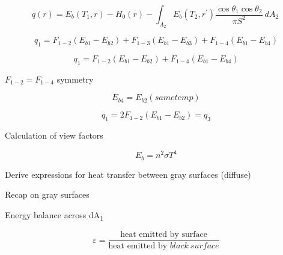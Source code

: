 \documentclass[12pt]{article}
\renewcommand{\_}{\kern-1.5pt\textunderscore\kern-1.5pt}
\begin{document}
\par

 \[ q \left( r \right)  =E_{b} \left( T_{1},r \right) -H_{0} \left( r \right)  - \int _{A_{2}}^{}E_{b} \left( T_{2},r^{'} \right) \frac{\cos  \theta _{1}\cos  \theta _{2}}{ \pi S^{2}}~dA_{2}~ \] \par

\par

\par

 \[ q_{1}=F_{1-2} \left( E_{b1}-E_{b2} \right) +F_{1-3} \left( E_{b1}-E_{b3} \right) +F_{1-4} \left( E_{b1}-E_{b4} \right)  \] \par

 \[ q_{1}=F_{1-2} \left( E_{b1}-E_{b2} \right) +F_{1-4} \left( E_{b1}-E_{b4} \right)  \] \par

 \( F_{1-2}=F_{1-4} \)   symmetry\par

 \[ E_{b4}=E_{b2}  \left( same temp \right)  \] \par

 \[ q_{1}=2F_{1-2} \left( E_{b1}-E_{b2} \right) =q_{3} \] \par

\par

Calculation of view factors\par

\par

 \[ E_{b}=n^{2} \sigma T^{4} \] \par

\par

Derive expressions for heat transfer between gray surfaces (diffuse)\par

\par

Recap on gray surfaces\par

\par

\par

Energy balance across dA\textsubscript{1}\par

 \[  \varepsilon =\frac{\text{heat emitted by surface}}{\text{heat emitted by }black~surface} \] \par
\end{document}
